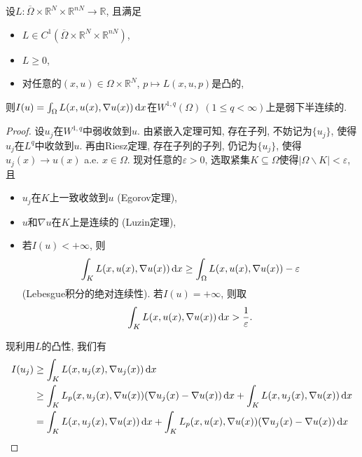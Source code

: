 \begin{theorem}
    设$L\colon \overline{\Omega} \times \mathbb{R}^N \times \mathbb{R}^{nN} \rightarrow \mathbb{R}$, 且满足 
    \begin{itemize}
        \item $L \in C^1(\overline{\Omega} \times \mathbb{R}^N \times \mathbb{R}^{nN})$, 
        \item $L \geq 0$,
        \item 对任意的$(x, u) \in \Omega \times \mathbb{R}^N$, $p \mapsto L(x, u, p)$是凸的,
    \end{itemize}
    则$I(u) = \int_{\Omega}L(x, u(x), \nabla u(x)) \,{\rm d}x$在$W^{1, q}(\Omega)\ (1 \leq q < \infty)$上是弱下半连续的.
    \begin{proof}
        设$u_j$在$W^{1, q}$中弱收敛到$u$. 由紧嵌入定理可知, 存在子列, 不妨记为$\{u_j\}$, 使得$u_j$在$L^q$中收敛到$u$.
        再由Riesz定理, 存在子列的子列, 仍记为$\{u_j\}$, 使得$u_j(x) \rightarrow u(x)$ a.e. $x \in \Omega$.
        现对任意的$\varepsilon > 0$, 选取紧集$K \subseteq \Omega$使得$|\Omega \smallsetminus K| < \varepsilon$, 且 
        \begin{itemize}
            \item $u_j$在$K$上一致收敛到$u$ (Egorov定理), 
            \item $u$和$\nabla u$在$K$上是连续的 (Luzin定理), 
            \item 若$I(u) < +\infty$, 则 
            \begin{equation*}
                \int_KL(x, u(x), \nabla u(x)) \,{\rm d}x \geq \int_{\Omega}L(x, u(x), \nabla u(x)) - \varepsilon
            \end{equation*}
            (Lebesgue积分的绝对连续性). 若$I(u) = +\infty$, 则取 
            \begin{equation*}
                \int_KL(x, u(x), \nabla u(x)) \,{\rm d}x > \frac{1}{\varepsilon}.
            \end{equation*}
        \end{itemize}
        现利用$L$的凸性, 我们有 
        \begin{align*}
            I(u_j) &\geq \int_KL(x, u_j(x), \nabla u_j(x)) \,{\rm d}x \\ 
            &\geq \int_KL_p(x, u_j(x), \nabla u(x))(\nabla u_j(x) - \nabla u(x)) \,{\rm d}x + \int_KL(x, u_j(x), \nabla u(x)) \,{\rm d}x \\ 
            &= \int_KL(x, u_j(x), \nabla u(x)) \,{\rm d}x + \int_KL_p(x, u(x), \nabla u(x))(\nabla u_j(x) - \nabla u(x)) \,{\rm d}x \\

\end{align*}
\end{proof}
\end{theorem}
